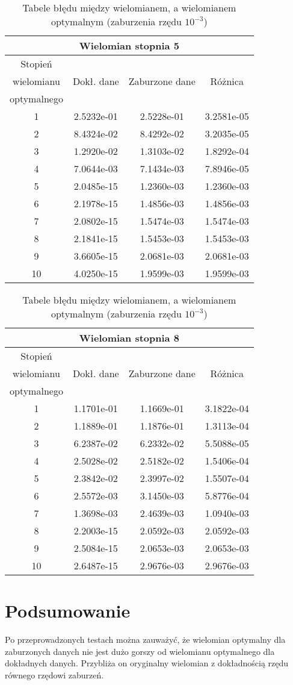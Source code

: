 \documentclass[a4paper]{article}
\theoremstyle{definition}
\theoremstyle{theorem}
\begin{document}
\begin{table}[!h]
  \begin{minipage}{.50\linewidth}
    \begin{tabular}{c|ccc}
      \multicolumn{4}{c}{Wielomian stopnia 5}\\
      \hline \hline
      Stopień &&\\
      wielomianu & Dokł. dane & Zaburzone dane & Różnica\\
      optymalnego &&\\
      \hline
1 & 2.5232e-01 & 2.5228e-01 & 3.2581e-05\\
2 & 8.4324e-02 & 8.4292e-02 & 3.2035e-05\\
3 & 1.2920e-02 & 1.3103e-02 & 1.8292e-04\\
4 & 7.0644e-03 & 7.1434e-03 & 7.8946e-05\\
5 & 2.0485e-15 & 1.2360e-03 & 1.2360e-03\\
6 & 2.1978e-15 & 1.4856e-03 & 1.4856e-03\\
7 & 2.0802e-15 & 1.5474e-03 & 1.5474e-03\\
8 & 2.1841e-15 & 1.5453e-03 & 1.5453e-03\\
9 & 3.6605e-15 & 2.0681e-03 & 2.0681e-03\\
10 & 4.0250e-15 & 1.9599e-03 & 1.9599e-03\\
\hline
    \end{tabular}
  \end{minipage}%
  \begin{minipage}{.50\linewidth}
    \begin{tabular}{c|ccc}
      \multicolumn{4}{c}{Wielomian stopnia 8}\\
      \hline \hline
      Stopień&&\\
      wielomianu & Dokł. dane & Zaburzone dane & Różnica\\
      optymalnego &&\\
      \hline
1 & 1.1701e-01 & 1.1669e-01 & 3.1822e-04\\
2 & 1.1889e-01 & 1.1876e-01 & 1.3113e-04\\
3 & 6.2387e-02 & 6.2332e-02 & 5.5088e-05\\
4 & 2.5028e-02 & 2.5182e-02 & 1.5406e-04\\
5 & 2.3842e-02 & 2.3997e-02 & 1.5507e-04\\
6 & 2.5572e-03 & 3.1450e-03 & 5.8776e-04\\
7 & 1.3698e-03 & 2.4639e-03 & 1.0940e-03\\
8 & 2.2003e-15 & 2.0592e-03 & 2.0592e-03\\
9 & 2.5084e-15 & 2.0653e-03 & 2.0653e-03\\
10 & 2.6487e-15 & 2.9676e-03 & 2.9676e-03\\
\hline
    \end{tabular}
  \end{minipage}
  \caption{Tabele błędu między wielomianem, a wielomianem optymalnym (zaburzenia rzędu $10^{-3}$)}
\end{table}

\section{Podsumowanie}
Po przeprowadzonych testach można zauważyć, że wielomian optymalny dla zaburzonych
danych nie jest dużo gorszy od wielomianu optymalnego dla dokładnych danych.
Przybliża on oryginalny wielomian z dokładnością rzędu równego rzędowi zaburzeń.
\end{document}
